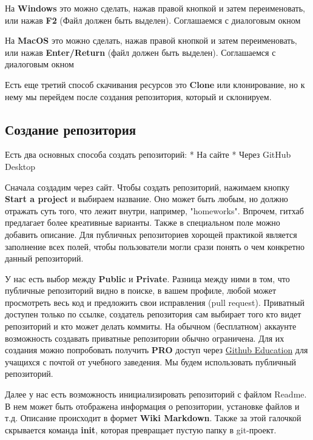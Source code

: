 \documentclass[11pt]{article}
\begin{document}
На \textbf{Windows} это можно сделать, нажав правой кнопкой и затем
переименовать, или нажав \textbf{F2} (Файл должен быть выделен).
Соглашаемся с диалоговым окном

На \textbf{MacOS} это можно сделать, нажав правой кнопкой и затем
переименовать, или нажав \textbf{Enter/Return} (файл должен быть
выделен). Соглашаемся с диалоговым окном

Есть еще третий способ скачивания ресурсов это \textbf{Clone} или
клонирование, но к нему мы перейдем после создания репозитория, который
и склонируем.

    \subsection{Создание
репозитория}\label{ux441ux43eux437ux434ux430ux43dux438ux435-ux440ux435ux43fux43eux437ux438ux442ux43eux440ux438ux44f}

Есть два основных способа создать репозиторий: * На сайте * Через GitHub
Desktop

Сначала создадим через сайт. Чтобы создать репозиторий, нажимаем кнопку
\textbf{Start a project} и выбираем название. Оно может быть любым, но
должно отражать суть того, что лежит внутри, например, "homeworks".
Впрочем, гитхаб предлагает более креативные варианты. Также в
специальном поле можно добавить описание. Для публичных репозиториев
хорощей практикой является заполнение всех полей, чтобы пользователи
могли срази понять о чем конкретно данный репозиторий.

    У нас есть выбор между \textbf{Public} и \textbf{Private}. Разница между
ними в том, что публичные репозиторий видно в поиске, в вашем профиле,
любой может просмотреть весь код и предложить свои исправления (pull
request). Приватный доступен только по ссылке, создатель репозитория сам
выбирает того кто видет репозиторий и кто может делать коммиты. На
обычном (бесплатном) аккаунте возможность создавать приватные
репозитории обычно ограничена. Для их создания можно попробовать
получить \textbf{PRO} доступ через
\href{https://education.github.com/}{Github Education} для учащихся с
почтой от учебного заведения. Мы будем использовать публичный
репозиторий.

Далее у нас есть возможность инициализировать репозиторий с файлом
Readme. В нем может быть отображена информация о репозитории, установке
файлов и т.д. Описание происходит в формет \textbf{Wiki Markdown}. Также
за этой галочкой скрывается команда \textbf{init}, которая превращает
пустую папку в git-проект.
\end{document}
